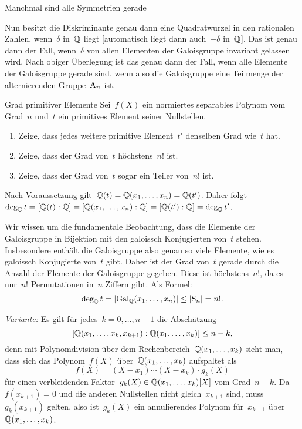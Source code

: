 \documentclass{algblatt}
\begin{document}
\begin{aufgabe}{Manchmal sind alle Symmetrien gerade}
\begin{loesungE}
Nun besitzt die Diskriminante genau dann eine Quadratwurzel in den rationalen
Zahlen, wenn~$\delta$ in~$\mathbb{Q}$ liegt [automatisch liegt dann auch~$-\delta$
in~$\mathbb{Q}$]. Das ist genau dann der Fall, wenn~$\delta$ von allen Elementen der
Galoisgruppe invariant gelassen wird. Nach obiger Überlegung ist das genau dann
der Fall, wenn alle Elemente der Galoisgruppe gerade sind, wenn also die
Galoisgruppe eine Teilmenge der alternierenden Gruppe~$\mathrm{A}_n$ ist.
\end{loesungE}
\end{aufgabe}

\begin{aufgabe}{Grad primitiver Elemente}
Sei~$f(X)$ ein normiertes separables Polynom vom Grad~$n$ und~$t$ ein
primitives Element seiner Nullstellen.
\begin{enumerate}
\item Zeige, dass jedes weitere primitive Element~$t'$ denselben Grad wie~$t$
hat.
\item Zeige, dass der Grad von~$t$ höchstens~$n!$ ist.
\item Zeige, dass der Grad von~$t$ sogar ein Teiler von~$n!$ ist.
\end{enumerate}

\begin{loesungE}
\item Nach Voraussetzung gilt~$\mathbb{Q}(t) = \mathbb{Q}(x_1,\ldots,x_n) = \mathbb{Q}(t')$. Daher
folgt $\deg_{\mathbb{Q}} t = [\mathbb{Q}(t):\mathbb{Q}] = [\mathbb{Q}(x_1,\ldots,x_n):\mathbb{Q}] =
[\mathbb{Q}(t'):\mathbb{Q}] = \deg_{\mathbb{Q}} t'$.

\item Wir wissen um die fundamentale Beobachtung, dass die Elemente der
Galoisgruppe in Bijektion mit den galoissch Konjugierten von~$t$ stehen.
Insbesondere enthält die Galoisgruppe also genau so viele Elemente, wie es
galoissch Konjugierte von~$t$ gibt. Daher ist der Grad von~$t$ gerade durch
die Anzahl der Elemente der Galoisgruppe gegeben. Diese ist höchstens~$n!$, da
es nur~$n!$ Permutationen in~$n$ Ziffern gibt. Als Formel:
\[ \deg_{\mathbb{Q}} t = |\mathrm{Gal}_{\mathbb{Q}}(x_1,\ldots,x_n)| \leq |\mathrm{S}_n| = n!. \]

\emph{Variante:} Es gilt für jedes~$k = 0,\ldots,n-1$ die Abschätzung
\[ [\mathbb{Q}(x_1,\ldots,x_k,x_{k+1}):\mathbb{Q}(x_1,\ldots,x_k)] \leq n - k, \]
denn mit Polynomdivision über dem Rechenbereich~$\mathbb{Q}(x_1,\ldots,x_k)$ sieht
man, dass sich das Polynom~$f(X)$ über~$\mathbb{Q}(x_1,\ldots,x_k)$ aufspaltet als
\[ f(X) = (X-x_1) \cdots (X-x_k) \cdot g_k(X) \]
für einen verbleidenden Faktor~$g_k(X) \in \mathbb{Q}(x_1,\ldots,x_k)[X]$ vom
Grad~$n-k$. Da~$f(x_{k+1}) = 0$ und die anderen Nullstellen nicht gleich~$x_{k+1}$ sind,
muss~$g_k(x_{k+1})$ gelten, also ist~$g_k(X)$ ein annulierendes Polynom
für~$x_{k+1}$ über~$\mathbb{Q}(x_1,\ldots,x_k)$.


\end{loesungE}
\end{aufgabe}
\end{document}
